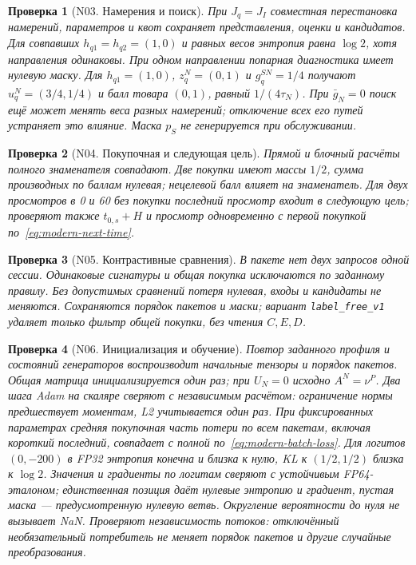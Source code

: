 \documentclass[12pt,a4paper]{article}
\newcommand{\code}[1]{{\ttfamily\small\nolinkurl{#1}}}
\theoremstyle{plainru}
\newtheorem{testcase}{Проверка}[section]
\begin{document}
\begin{testcase}[N03. Намерения и поиск]
При $J_q=J_I$ совместная перестановка намерений, параметров и квот
сохраняет представления, оценки и кандидатов.
Для совпавших $h_{q1}=h_{q2}=(1,0)$ и равных весов энтропия равна
$\log2$, хотя направления одинаковы. При одном направлении
попарная диагностика имеет нулевую маску.
Для $h_{q1}=(1,0)$, $z_q^N=(0,1)$ и $g_q^{SN}=1/4$
получают $u_q^N=(3/4,1/4)$ и балл товара $(0,1)$, равный $1/(4\tau_N)$.
При $\bar g_N=0$ поиск ещё может менять веса разных намерений;
отключение всех его путей устраняет это влияние. Маска $p_S$
не генерируется при обслуживании.
\end{testcase}

\begin{testcase}[N04. Покупочная и следующая цель]
Прямой и блочный расчёты полного знаменателя совпадают.
Две покупки имеют массы $1/2$, сумма производных по баллам нулевая;
нецелевой балл влияет на знаменатель.
Для двух просмотров в 0 и 60 без покупки последний просмотр
входит в следующую цель; проверяют также $t_{0,s}+H$ и просмотр
одновременно с первой покупкой по~\eqref{eq:modern-next-time}.
\end{testcase}

\begin{testcase}[N05. Контрастивные сравнения]
В пакете нет двух запросов одной сессии. Одинаковые сигнатуры
и общая покупка исключаются по заданному правилу.
Без допустимых сравнений потеря нулевая, входы и кандидаты не меняются.
Сохраняются порядок пакетов и маски; вариант \code{label_free_v1}
удаляет только фильтр общей покупки, без чтения $C,E,D$.
\end{testcase}

\begin{testcase}[N06. Инициализация и обучение]
Повтор заданного профиля и состояний генераторов воспроизводит
начальные тензоры и порядок пакетов. Общая матрица инициализируется
один раз; при $U_N=0$ исходно $A^N=\nu^P$.
Два шага Adam на скаляре сверяют с независимым расчётом:
ограничение нормы предшествует моментам, L2 учитывается один раз.
При фиксированных параметрах средняя покупочная часть потери
по всем пакетам, включая короткий последний, совпадает с полной
по~\eqref{eq:modern-batch-loss}.
Для логитов $(0,-200)$ в FP32 энтропия конечна и близка к нулю,
KL к $(1/2,1/2)$ близка к $\log2$. Значения и градиенты по логитам
сверяют с устойчивым FP64-эталоном; единственная позиция даёт нулевые
энтропию и градиент, пустая маска --- предусмотренную нулевую ветвь.
Округление вероятности до нуля не вызывает NaN.
Проверяют независимость потоков: отключённый необязательный потребитель
не меняет порядок пакетов и другие случайные преобразования.
\end{testcase}
\end{document}

